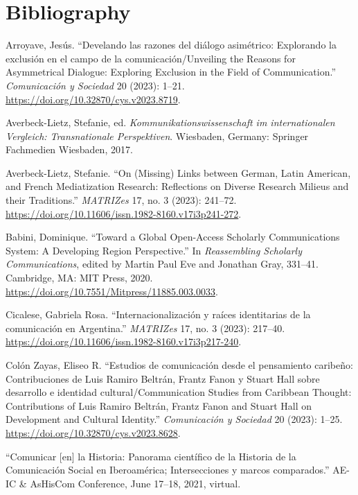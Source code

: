 \documentclass{tufte-handout}
\begin{document}
\section{Bibliography}\label{bibliography}

\begin{hangparas}{.25in}{1} 



Arroyave, Jesús. ``Develando las razones del diálogo asimétrico:
Explorando la exclusión en el campo de la comunicación/Unveiling the
Reasons for Asymmetrical Dialogue: Exploring Exclusion in the Field of
Communication.'' \emph{Comunicación y Sociedad} 20 (2023): 1--21.
\url{https://doi.org/10.32870/cys.v2023.8719}.

Averbeck-Lietz, Stefanie, ed. \emph{Kommunikationswissenschaft im
internationalen Vergleich: Transnationale Perspektiven}. Wiesbaden,
Germany: Springer Fachmedien Wiesbaden, 2017.

Averbeck-Lietz, Stefanie. ``On (Missing) Links between German, Latin
American, and French Mediatization Research: Reflections on Diverse
Research Milieus and their Traditions.'' \emph{MATRIZes} 17, no. 3
(2023): 241--72.
\url{https://doi.org/10.11606/issn.1982-8160.v17i3p241-272}.

Babini, Dominique. ``Toward a Global Open-Access Scholarly
Communications System: A Developing Region Perspective.'' In
\emph{Reassembling Scholarly Communications}, edited by Martin Paul Eve
and Jonathan Gray, 331--41. Cambridge, MA: MIT Press, 2020.
\url{https://doi.org/10.7551/Mitpress/11885.003.0033}.

Cicalese, Gabriela Rosa. ``Internacionalización y raíces identitarias de
la comunicación en Argentina.'' \emph{MATRIZes} 17, no. 3 (2023):
217--40. \url{https://doi.org/10.11606/issn.1982-8160.v17i3p217-240}.

Colón Zayas, Eliseo R. ``Estudios de comunicación desde el pensamiento
caribeño: Contribuciones de Luis Ramiro Beltrán, Frantz Fanon y Stuart
Hall sobre desarrollo e identidad cultural/Communication Studies from
Caribbean Thought: Contributions of Luis Ramiro Beltrán, Frantz Fanon
and Stuart Hall on Development and Cultural Identity.''
\emph{Comunicación y Sociedad} 20 (2023): 1--25.
\url{https://doi.org/10.32870/cys.v2023.8628}.

``Comunicar {[}en{]} la Historia: Panorama científico de la Historia de
la Comunicación Social en Iberoamérica; Intersecciones y marcos
comparados.'' AE-IC \& AsHisCom Conference, June 17--18, 2021, virtual.


\end{hangparas}
\end{document}
